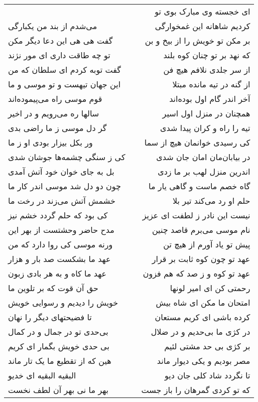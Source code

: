 \begin{center}
\begin{longtable}{l p{0.5cm} r}
&&
ای خجسته وی مبارک بوی تو
\\
می‌شدم از بند من یکبارگی
&&
کردیم شاهانه این غمخوارگی
\\
گفت هی هی این دعا دیگر مکن
&&
بر مکن تو خویش را از بیخ و بن
\\
تو چه طاقت داری ای مور نژند
&&
که نهد بر تو چنان کوه بلند
\\
گفت توبه کردم ای سلطان که من
&&
از سر جلدی نلافم هیچ فن
\\
این جهان تیهست و تو موسی و ما
&&
از گنه در تیه مانده مبتلا
\\
قوم موسی راه می‌پیموده‌اند
&&
آخر اندر گام اول بوده‌اند
\\
سالها ره می‌رویم و در اخیر
&&
همچنان در منزل اول اسیر
\\
گر دل موسی ز ما راضی بدی
&&
تیه را راه و کران پیدا شدی
\\
ور بکل بیزار بودی او ز ما
&&
کی رسیدی خوانمان هیچ از سما
\\
کی ز سنگی چشمه‌ها جوشان شدی
&&
در بیابان‌مان امان جان شدی
\\
بل به جای خوان خود آتش آمدی
&&
اندرین منزل لهب بر ما زدی
\\
چون دو دل شد موسی اندر کار ما
&&
گاه خصم ماست و گاهی یار ما
\\
خشمش آتش می‌زند در رخت ما
&&
حلم او رد می‌کند تیر بلا
\\
کی بود که حلم گردد خشم نیز
&&
نیست این نادر ز لطفت ای عزیز
\\
مدح حاضر وحشتست از بهر این
&&
نام موسی می‌برم قاصد چنین
\\
ورنه موسی کی روا دارد که من
&&
پیش تو یاد آورم از هیچ تن
\\
عهد ما بشکست صد بار و هزار
&&
عهد تو چون کوه ثابت بر قرار
\\
عهد ما کاه و به هر بادی زبون
&&
عهد تو کوه و ز صد که هم فزون
\\
حق آن قوت که بر تلوین ما
&&
رحمتی کن ای امیر لونها
\\
خویش را دیدیم و رسوایی خویش
&&
امتحان ما مکن ای شاه بیش
\\
تا فضیحتهای دیگر را نهان
&&
کرده باشی ای کریم مستعان
\\
بی‌حدی تو در جمال و در کمال
&&
در کژی ما بی‌حدیم و در ضلال
\\
بی حدی خویش بگمار ای کریم
&&
بر کژی بی حد مشتی لئیم
\\
هین که از تقطیع ما یک تار ماند
&&
مصر بودیم و یکی دیوار ماند
\\
البقیه البقیه ای خدیو
&&
تا نگردد شاد کلی جان دیو
\\
بهر ما نی بهر آن لطف نخست
&&
که تو کردی گمرهان را باز جست

\end{longtable}
\end{center}
